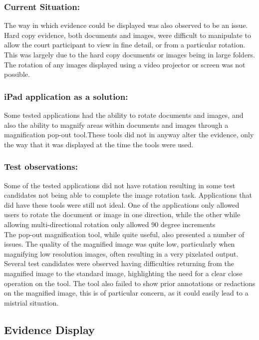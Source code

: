 \subsubsection{Current Situation:}
The way in which evidence could be displayed was also observed to be an issue. Hard copy evidence, both documents and images, were difficult to manipulate to allow the court participant to view in fine detail, or from a particular rotation. This was largely due to the hard copy documents or images being in large folders. The rotation of any images displayed using a video projector or screen was not possible.\\
\subsubsection{iPad application as a solution:}
Some tested applications had the ability to rotate documents and images, and also the ability to magnify areas within documents and images through a magnification pop-out tool.These tools did not in anyway alter the evidence, only the way that it was displayed at the time the tools were used.\\
\subsubsection{Test observations:}
Some of the tested applications did not have rotation resulting in some test candidates not being able to complete the image rotation task. Applications that did have these tools were still not ideal. One of the applications only allowed users to rotate the document or image in one direction, while the other while allowing multi-directional rotation only allowed 90 degree increments\\
The pop-out magnification tool, while quite useful, also presented a number of issues. The quality of the magnified image was quite low, particularly when magnifying low resolution images, often resulting in a very pixelated output. Several test candidates were observed having difficulties returning from the magnified image to the standard image, highlighting the need for a clear close operation on the tool. The tool also failed to show prior annotations or redactions on the magnified image, this is of particular concern, as it could easily lead to a mistrial situation.

\subsection{Evidence Display}
